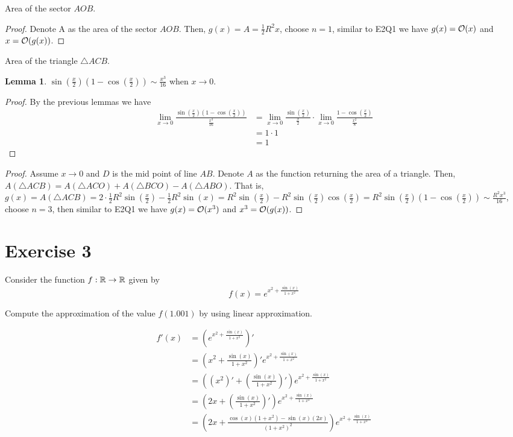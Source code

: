 \documentclass{homework}
\newcommand{\R}{\bb{R}} %
\newcommand{\?}{\stackrel{?}{=}}
\theoremstyle{definition}
\newtheorem*{lemma}{Lemma}
\begin{document}
\question[3] Area of the sector $AOB$.

\begin{proof}
    Denote A as the area of the sector $AOB$. Then, $g(x)=A=\frac12R^2x$, choose $n=1$, similar to E2Q1 we have $g(x)=\cal{O}(x)$ and $x=\cal{O}(g(x))$. 
\end{proof}

\question[4] Area of the triangle $\triangle ACB$.

\begin{lemma}
    $\sin(\frac{x}2)(1-\cos(\frac{x}2))\sim \frac{x^3}{16}$ when $x\to0$.

    \begin{proof}
        By the previous lemmas we have \begin{align*}
            \lim_{x\to0}\frac{\sin(\frac{x}2)(1-\cos(\frac{x}2))}{\frac{x^3}{16}}&=\lim_{x\to0}\frac{\sin(\frac{x}2)}{\frac{x}{2}}\cdot\lim_{x\to0}\frac{1-\cos(\frac{x}2)}{\frac{x^2}{8}}\\
            &=1\cdot1\\
            &=1
        \end{align*}
    \end{proof}
\end{lemma}

\begin{proof}
    Assume $x\to0$ and $D$ is the mid point of line $AB$. Denote $A$ as the function returning the area of a triangle. Then, $A(\triangle ACB)=A(\triangle ACO)+A(\triangle BCO)-A(\triangle ABO)$. That is, $g(x)=A(\triangle ACB)=2\cdot\frac12R^2\sin(\frac{x}2)-\frac12R^2\sin(x)=R^2\sin(\frac{x}2)-R^2\sin(\frac{x}2)\cos(\frac{x}{2})=R^2\sin(\frac{x}2)(1-\cos(\frac{x}{2}))\sim \frac{R^2x^3}{16}$, choose $n=3$, then similar to E2Q1 we have $g(x)=\cal{O}(x^3)$ and $x^3=\cal{O}(g(x))$.
\end{proof}


\newpage
\section*{Exercise 3}

Consider the function $f:\R\to\R$ given by \[f(x)=e^{x^2+\frac{\sin(x)}{1+x^2}}\]

\question[1] Compute the approximation of the value $f(1.001)$ by using linear approximation.

\begin{align*}
    f'(x)&=(e^{x^2+\frac{\sin(x)}{1+x^2}})'\\
    &=(x^2+\frac{\sin(x)}{1+x^2})'e^{x^2+\frac{\sin(x)}{1+x^2}}\\
    &=((x^2)'+(\frac{\sin(x)}{1+x^2})')e^{x^2+\frac{\sin(x)}{1+x^2}}\\
    &=(2x+(\frac{\sin(x)}{1+x^2})')e^{x^2+\frac{\sin(x)}{1+x^2}}\\
    &=(2x+\frac{\cos(x)(1+x^2)-\sin(x)(2x)}{(1+x^2)^2})e^{x^2+\frac{\sin(x)}{1+x^2}}\\
\end{align*}
\end{document}

